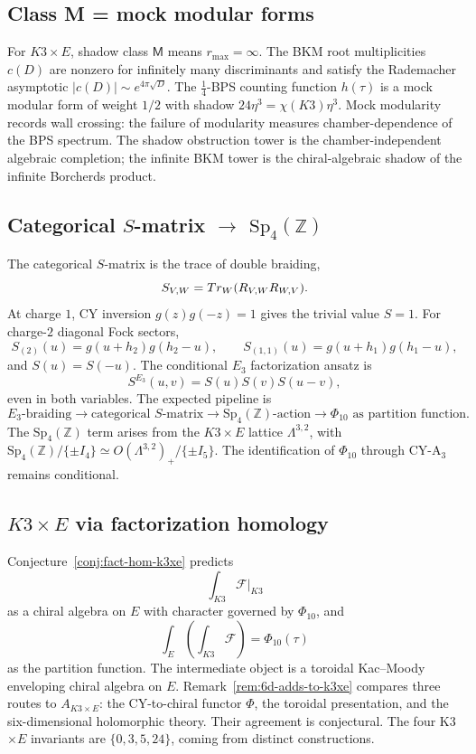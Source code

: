 \documentclass[11pt]{article}
\newcommand{\Z}{\mathbb{Z}}
\theoremstyle{plain}
\theoremstyle{definition}
\theoremstyle{remark}
\begin{document}
\subsection{Class M = mock modular forms}

For $K3\times E$, shadow class $\mathsf{M}$ means
$r_{\max}=\infty$. The BKM root multiplicities $c(D)$ are nonzero for
infinitely many discriminants and satisfy the Rademacher asymptotic
$|c(D)|\sim e^{4\pi\sqrt D}$. The $\frac14$-BPS counting function
$h(\tau)$ is a mock modular form of weight $1/2$ with shadow
$24\eta^3=\chi(K3)\eta^3$. Mock modularity records wall crossing:
the failure of modularity measures chamber-dependence of the BPS
spectrum. The shadow obstruction tower is the chamber-independent
algebraic completion; the infinite BKM tower is the chiral-algebraic
shadow of the infinite Borcherds product.

\subsection{Categorical $S$-matrix $\to$ $\mathrm{Sp}_4(\Z)$}

The categorical $S$-matrix is the trace of double braiding,
\[
 S_{V,W}=Tr_W(R_{V,W}R_{W,V}).
\]
At charge $1$, CY inversion $g(z)g(-z)=1$ gives the trivial value
$S=1$. For charge-$2$ diagonal Fock sectors,
\[
 S_{(2)}(u)=g(u+h_2)g(h_2-u),\qquad
 S_{(1,1)}(u)=g(u+h_1)g(h_1-u),
\]
and $S(u)=S(-u)$. The conditional $E_3$ factorization ansatz is
\[
 S^{E_3}(u,v)=S(u)S(v)S(u-v),
\]
even in both variables. The expected pipeline is
\[
 E_3\text{-braiding}\longrightarrow \text{categorical }S\text{-matrix}
 \longrightarrow \mathrm{Sp}_4(\Z)\text{-action}
 \longrightarrow \Phi_{10}\text{ as partition function}.
\]
The $\mathrm{Sp}_4(\Z)$ term arises from the $K3\times E$ lattice
$\Lambda^{3,2}$, with
$\mathrm{Sp}_4(\Z)/\{\pm I_4\}\simeq O(\Lambda^{3,2})_+/\{\pm I_5\}$.
The identification of $\Phi_{10}$ through CY-A$_3$ remains
conditional.

\subsection{$K3 \times E$ via factorization homology}

Conjecture~\ref{conj:fact-hom-k3xe} predicts
\[
 \int_{K3}\mathcal F|_{K3}
\]
as a chiral algebra on $E$ with character governed by $\Phi_{10}$, and
\[
 \int_E\left(\int_{K3}\mathcal F\right)=\Phi_{10}(\tau)
\]
as the partition function. The intermediate object is a toroidal
Kac--Moody enveloping chiral algebra on $E$. Remark~\ref{rem:6d-adds-to-k3xe}
compares three routes to $A_{K3\times E}$: the CY-to-chiral functor
$\Phi$, the toroidal presentation, and the six-dimensional holomorphic
theory. Their agreement is conjectural. The four K3$\times E$
invariants are $\{0,3,5,24\}$, coming from distinct constructions.
\end{document}
